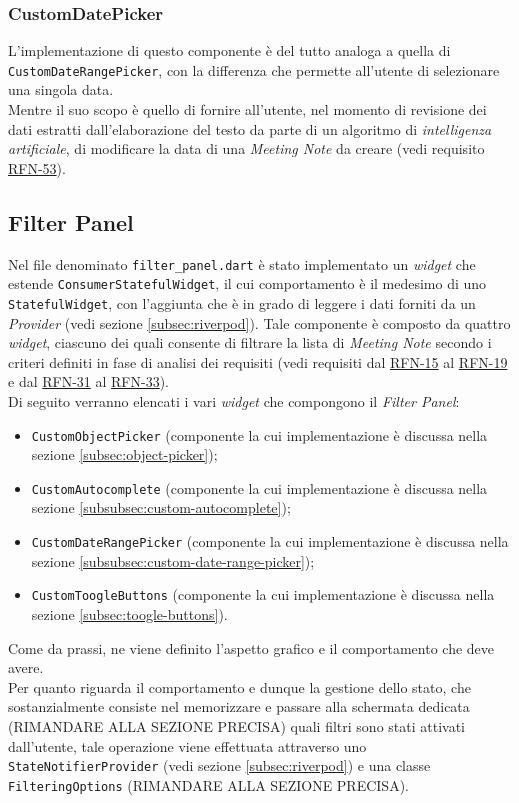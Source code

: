 \subsubsection*{CustomDatePicker}
\label{subsubsec:custom-date-picker}

L'implementazione di questo componente è del tutto analoga a quella di \lstinline{CustomDateRangePicker}, con la differenza che permette all'utente di selezionare una singola data.\\
Mentre il suo scopo è quello di fornire all'utente, nel momento di revisione dei dati estratti dall'elaborazione del testo da parte di un algoritmo di \emph{intelligenza artificiale}, di modificare la data di una \emph{Meeting Note} da creare (vedi requisito \hyperref[RFN-53]{RFN-53}).

\subsection{Filter Panel}
\label{subsec:filter-panel}

Nel file denominato \lstinline{filter_panel.dart} è stato implementato un \emph{widget} che estende \lstinline{ConsumerStatefulWidget}\cite{site:reading-provider}, il cui comportamento è il medesimo di uno \lstinline{StatefulWidget}, con l'aggiunta che è in grado di leggere i dati forniti da un \emph{Provider} (vedi sezione \ref{subsec:riverpod}).
Tale componente è composto da quattro \emph{widget}, ciascuno dei quali consente di filtrare la lista di \emph{Meeting Note}  secondo i criteri definiti in fase di analisi dei requisiti (vedi requisiti dal \hyperref[RFN-15]{RFN-15} al \hyperref[RFN-19]{RFN-19} e dal \hyperref[RFN-31]{RFN-31} al \hyperref[RFN-33]{RFN-33}). \\
Di seguito verranno elencati i vari \emph{widget} che compongono il \emph{Filter Panel}: 
\begin{itemize}
    \item \lstinline{CustomObjectPicker} (componente la cui implementazione è discussa nella sezione \ref{subsec:object-picker});
    \item \lstinline{CustomAutocomplete} (componente la cui implementazione è discussa nella sezione \ref{subsubsec:custom-autocomplete});
    \item \lstinline{CustomDateRangePicker} (componente la cui implementazione è discussa nella sezione \ref{subsubsec:custom-date-range-picker});
    \item \lstinline{CustomToogleButtons} (componente la cui implementazione è discussa nella sezione \ref{subsec:toogle-buttons}).
\end{itemize}
Come da prassi, ne viene definito l'aspetto grafico e il comportamento che deve avere.\\
Per quanto riguarda il comportamento e dunque la gestione dello stato, che sostanzialmente consiste nel memorizzare e passare alla schermata dedicata (RIMANDARE ALLA SEZIONE PRECISA) quali filtri sono stati attivati dall'utente, tale operazione viene effettuata attraverso uno \lstinline{StateNotifierProvider} (vedi sezione \ref{subsec:riverpod}) e una classe \lstinline{FilteringOptions} (RIMANDARE ALLA SEZIONE PRECISA).\\

